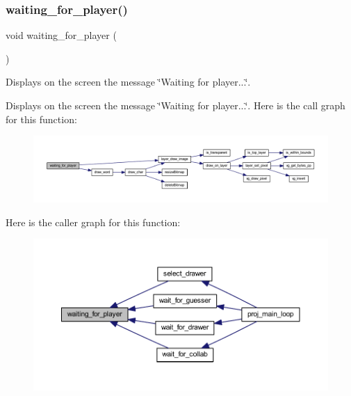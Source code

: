 \subsubsection{\texorpdfstring{waiting\+\_\+for\+\_\+player()}{waiting\_for\_player()}}
{\footnotesize\ttfamily void waiting\+\_\+for\+\_\+player (\begin{DoxyParamCaption}{ }\end{DoxyParamCaption})}



Displays on the screen the message \char`\"{}\+Waiting for player...\char`\"{}. 

Displays on the screen the message \char`\"{}\+Waiting for player...\char`\"{}. Here is the call graph for this function\+:\nopagebreak
\begin{figure}[H]
\begin{center}
\leavevmode
\includegraphics[width=350pt]{group__pengoo_gad1277ef243282251ffd9bc319abf4cac_cgraph}
\end{center}
\end{figure}
Here is the caller graph for this function\+:\nopagebreak
\begin{figure}[H]
\begin{center}
\leavevmode
\includegraphics[width=350pt]{group__pengoo_gad1277ef243282251ffd9bc319abf4cac_icgraph}
\end{center}
\end{figure}
